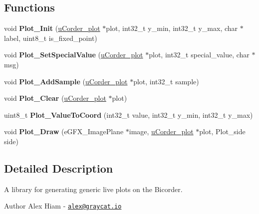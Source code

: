\subsection*{Functions}
\begin{DoxyCompactItemize}
\item 
void {\bfseries Plot\+\_\+\+Init} (\hyperlink{structuCorder__plot}{u\+Corder\+\_\+plot} $\ast$plot, int32\+\_\+t y\+\_\+min, int32\+\_\+t y\+\_\+max, char $\ast$label, uint8\+\_\+t is\+\_\+fixed\+\_\+point)\hypertarget{bicorder-plotter_8c_a6fc1ecf8fe19709fbe8bdbb9b98b9f06}{}\label{bicorder-plotter_8c_a6fc1ecf8fe19709fbe8bdbb9b98b9f06}

\item 
void {\bfseries Plot\+\_\+\+Set\+Special\+Value} (\hyperlink{structuCorder__plot}{u\+Corder\+\_\+plot} $\ast$plot, int32\+\_\+t special\+\_\+value, char $\ast$msg)\hypertarget{bicorder-plotter_8c_a4ae0908e6a603750e088b87c3a098fe1}{}\label{bicorder-plotter_8c_a4ae0908e6a603750e088b87c3a098fe1}

\item 
void {\bfseries Plot\+\_\+\+Add\+Sample} (\hyperlink{structuCorder__plot}{u\+Corder\+\_\+plot} $\ast$plot, int32\+\_\+t sample)\hypertarget{bicorder-plotter_8c_ab5ce1c6e4771915429b750f013f69ea1}{}\label{bicorder-plotter_8c_ab5ce1c6e4771915429b750f013f69ea1}

\item 
void {\bfseries Plot\+\_\+\+Clear} (\hyperlink{structuCorder__plot}{u\+Corder\+\_\+plot} $\ast$plot)\hypertarget{bicorder-plotter_8c_a554a1bcc124c09b63ae03bbbbd210653}{}\label{bicorder-plotter_8c_a554a1bcc124c09b63ae03bbbbd210653}

\item 
uint8\+\_\+t {\bfseries Plot\+\_\+\+Value\+To\+Coord} (int32\+\_\+t value, int32\+\_\+t y\+\_\+min, int32\+\_\+t y\+\_\+max)\hypertarget{bicorder-plotter_8c_a739359bcd29378ccdf215fe038bd9ab3}{}\label{bicorder-plotter_8c_a739359bcd29378ccdf215fe038bd9ab3}

\item 
void {\bfseries Plot\+\_\+\+Draw} (e\+G\+F\+X\+\_\+\+Image\+Plane $\ast$image, \hyperlink{structuCorder__plot}{u\+Corder\+\_\+plot} $\ast$plot, Plot\+\_\+side side)\hypertarget{bicorder-plotter_8c_aa77f4c18a3b6c579b14a4d6603fd971b}{}\label{bicorder-plotter_8c_aa77f4c18a3b6c579b14a4d6603fd971b}

\end{DoxyCompactItemize}


\subsection{Detailed Description}
A library for generating generic live plots on the Bicorder. 

\begin{DoxyAuthor}{Author}
Alex Hiam -\/ \href{mailto:alex@graycat.io}{\tt alex@graycat.\+io} 
\end{DoxyAuthor}
